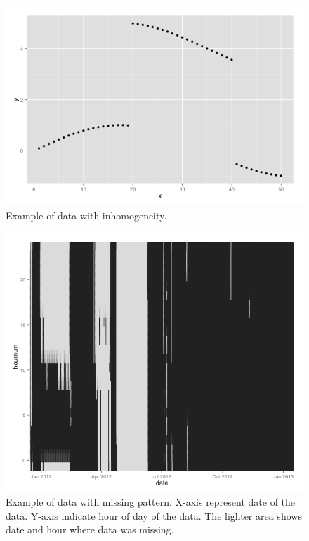 \documentclass[conference]{IEEEtran}
\begin{document}
\begin{figure}
	\includegraphics[width=\linewidth]{figure2.png}
	\caption{Example of data with inhomogeneity.}
	\label{fig:example_inhomogeneity}
\end{figure}

\begin{figure}
	\includegraphics[width=\linewidth]{figure3.png}
	\caption{Example of data with missing pattern. X-axis represent date of the data. Y-axis indicate hour of day of the data. The lighter area shows date and hour where data was missing.}
	\label{fig:example_missingpattern}
\end{figure}
\end{document}
